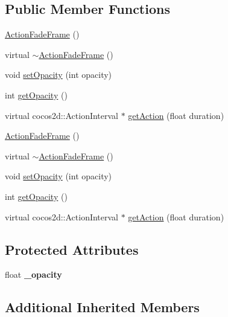 \subsection*{Public Member Functions}
\begin{DoxyCompactItemize}
\item 
\hyperlink{classcocostudio_1_1ActionFadeFrame_ac2a18b75564fc79639e7c8883a855b28}{Action\+Fade\+Frame} ()
\item 
virtual \hyperlink{classcocostudio_1_1ActionFadeFrame_a7f78c6950a476e5f7d2d178b465b82dc}{$\sim$\+Action\+Fade\+Frame} ()
\item 
void \hyperlink{classcocostudio_1_1ActionFadeFrame_a1406c854b4e65c99e81566e1c4d95ea5}{set\+Opacity} (int opacity)
\item 
int \hyperlink{classcocostudio_1_1ActionFadeFrame_af7b5349e249e88ec98384513cb370751}{get\+Opacity} ()
\item 
virtual cocos2d\+::\+Action\+Interval $\ast$ \hyperlink{classcocostudio_1_1ActionFadeFrame_a666690711af56eb3dbe6e39c43655f08}{get\+Action} (float duration)
\item 
\hyperlink{classcocostudio_1_1ActionFadeFrame_ac2a18b75564fc79639e7c8883a855b28}{Action\+Fade\+Frame} ()
\item 
virtual \hyperlink{classcocostudio_1_1ActionFadeFrame_ac1da06ec727168c4db008cf6ddaa2424}{$\sim$\+Action\+Fade\+Frame} ()
\item 
void \hyperlink{classcocostudio_1_1ActionFadeFrame_a1406c854b4e65c99e81566e1c4d95ea5}{set\+Opacity} (int opacity)
\item 
int \hyperlink{classcocostudio_1_1ActionFadeFrame_af7b5349e249e88ec98384513cb370751}{get\+Opacity} ()
\item 
virtual cocos2d\+::\+Action\+Interval $\ast$ \hyperlink{classcocostudio_1_1ActionFadeFrame_a8c4fd77023be47a8879597c06b89e2a1}{get\+Action} (float duration)
\end{DoxyCompactItemize}
\subsection*{Protected Attributes}
\begin{DoxyCompactItemize}
\item 
\mbox{\label{classcocostudio_1_1ActionFadeFrame_a8002cd7dc84d83d3b5b2600a20219a8f}} 
float {\bfseries \+\_\+opacity}
\end{DoxyCompactItemize}
\subsection*{Additional Inherited Members}


